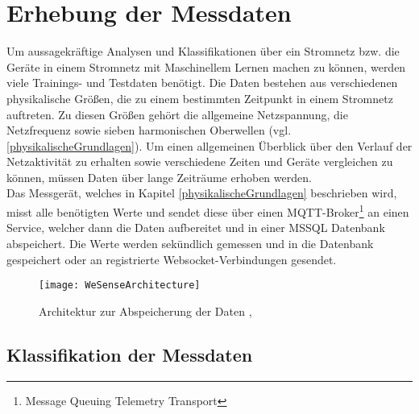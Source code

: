 
\section{Erhebung der Messdaten} \label{Messdaten}

    Um aussagekräftige Analysen und Klassifikationen über ein Stromnetz bzw. die Geräte in einem Stromnetz mit Maschinellem Lernen machen zu können, werden viele Trainings- und Testdaten benötigt.
    Die Daten bestehen aus verschiedenen physikalische Größen, die zu einem bestimmten Zeitpunkt in einem Stromnetz auftreten.
    Zu diesen Größen gehört die allgemeine Netzspannung, die Netzfrequenz sowie sieben harmonischen Oberwellen (vgl. \ref{physikalischeGrundlagen}).
    Um einen allgemeinen Überblick über den Verlauf der Netzaktivität zu erhalten sowie verschiedene Zeiten und Geräte vergleichen zu können, müssen Daten über lange Zeiträume erhoben werden.\\
    \newline
    Das Messgerät, welches in Kapitel \ref{physikalischeGrundlagen} beschrieben wird, misst alle benötigten Werte und sendet diese über einen MQTT-Broker\footnote{Message Queuing Telemetry Transport} an einen Service, welcher dann die Daten aufbereitet und in einer MSSQL Datenbank abspeichert.
    Die Werte werden sekündlich gemessen und in die Datenbank gespeichert oder an registrierte Websocket-Verbindungen gesendet.
    \newline

    \begin{figure}[h]
        \centering
        \texttt{[image: WeSenseArchitecture]}
        \caption{Architektur zur Abspeicherung der Daten \protect\cite{DrawIO}, \protect\cite{Tensorflow}}
        \label{fig:ArchitectureWesense}
    \end{figure}

    \subsection*{Klassifikation der Messdaten}\label{KlassifikationDerMessdaten}

